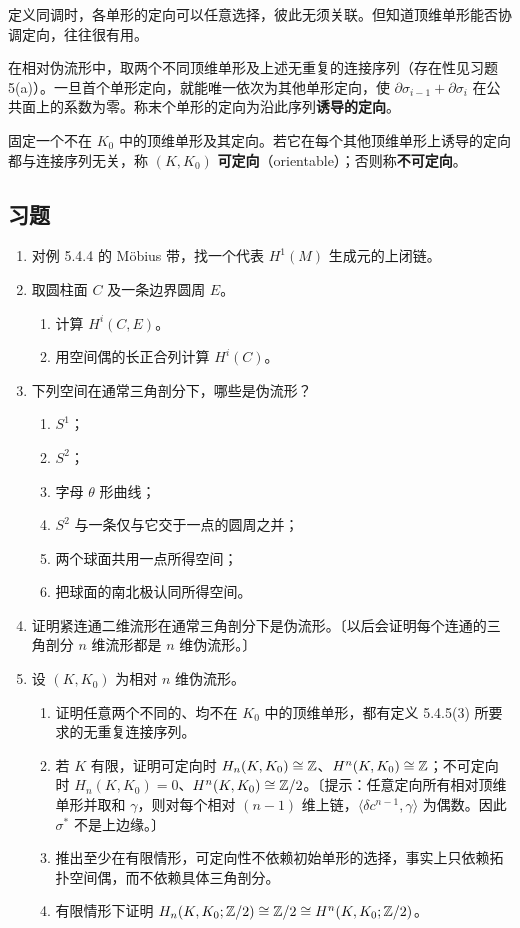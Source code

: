 定义同调时，各单形的定向可以任意选择，彼此无须关联。但知道顶维单形能否协调定向，往往很有用。

在相对伪流形中，取两个不同顶维单形及上述无重复的连接序列（存在性见习题 5(a)）。一旦首个单形定向，就能唯一依次为其他单形定向，使 $\partial\sigma_{i-1}+\partial\sigma_i$ 在公共面上的系数为零。称末个单形的定向为沿此序列\textbf{诱导的定向}。

固定一个不在 $K_0$ 中的顶维单形及其定向。若它在每个其他顶维单形上诱导的定向都与连接序列无关，称 $(K,K_0)$ \textbf{可定向}（orientable）；否则称\textbf{不可定向}。

\subsection*{习题}
\begin{enumerate}
\item 对例 5.4.4 的 Möbius 带，找一个代表 $H^1(M)$ 生成元的上闭链。
\item 取圆柱面 $C$ 及一条边界圆周 $E$。
\begin{enumerate}[label=(\alph*)]
\item 计算 $H^i(C,E)$。
\item 用空间偶的长正合列计算 $H^i(C)$。
\end{enumerate}
\item 下列空间在通常三角剖分下，哪些是伪流形？
\begin{enumerate}[label=(\alph*)]
\item $S^1$；
\item $S^2$；
\item 字母 $\theta$ 形曲线；
\item $S^2$ 与一条仅与它交于一点的圆周之并；
\item 两个球面共用一点所得空间；
\item 把球面的南北极认同所得空间。
\end{enumerate}
\item 证明紧连通二维流形在通常三角剖分下是伪流形。〔以后会证明每个连通的三角剖分 $n$ 维流形都是 $n$ 维伪流形。〕
\item 设 $(K,K_0)$ 为相对 $n$ 维伪流形。
\begin{enumerate}[label=(\alph*)]
\item 证明任意两个不同的、均不在 $K_0$ 中的顶维单形，都有定义 5.4.5(3) 所要求的无重复连接序列。
\item 若 $K$ 有限，证明可定向时 $H_n(K,K_0)\cong\mathbb{Z}$、$H^n(K,K_0)\cong\mathbb{Z}$；不可定向时 $H_n(K,K_0)=0$、$H^n(K,K_0)\cong\mathbb{Z}/2$。〔提示：任意定向所有相对顶维单形并取和 $\gamma$，则对每个相对 $(n-1)$ 维上链，$\langle\delta c^{n-1},\gamma\rangle$ 为偶数。因此 $\sigma^*$ 不是上边缘。〕
\item 推出至少在有限情形，可定向性不依赖初始单形的选择，事实上只依赖拓扑空间偶，而不依赖具体三角剖分。
\item 有限情形下证明 $H_n(K,K_0;\mathbb{Z}/2)\cong\mathbb{Z}/2\cong H^n(K,K_0;\mathbb{Z}/2)$。
\end{enumerate}
\end{enumerate}
